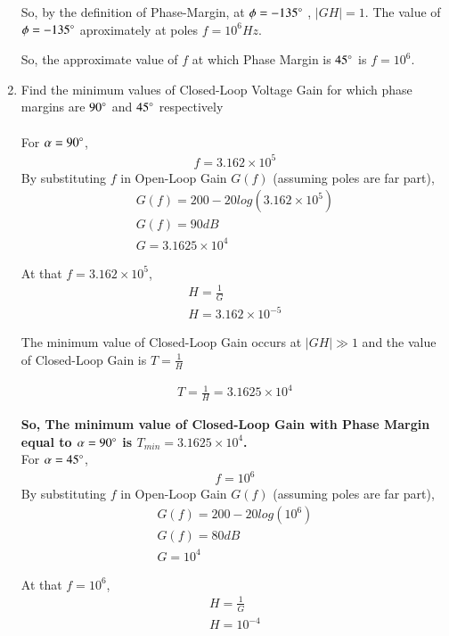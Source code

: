 \begin{enumerate}[label=\thesection.\arabic*.,ref=\thesection.\theenumi]
So, by the definition of Phase-Margin, at $\phi = -135\degree$ , $|GH| = 1 $.  The value of $\phi = -135\degree$ aproximately at poles $f=10^{6} Hz$. 

So, the approximate value of $f$ at which Phase Margin is $45\degree$ is $f=10^{6}$.\\
\item Find the minimum values of Closed-Loop Voltage Gain for which phase margins are $90\degree$ and  $45\degree$ respectively\\
\solution\\
For $\alpha=90\degree$,
\begin{align}
f=3.162 \times 10^{5}
\end{align}
By substituting $f$ in Open-Loop Gain $G(f)$ (assuming poles are far part), 
\begin{align}
G(f) = 200 - 20log(3.162 \times 10^{5})\\
G(f) = 90 dB \\
G = 3.1625 \times 10^{4}
\end{align}

At that $f=3.162 \times 10^{5}$, 
\begin{align}
H = \frac{1}{G}\\
H = 3.162 \times 10^{-5}
\end{align}

The minimum value of Closed-Loop Gain occurs at $|GH| \gg 1$ and the value of Closed-Loop Gain is $T=\frac{1}{H}$

\begin{align}
T = \frac{1}{H} = 3.1625 \times 10^{4}
\end{align}

\textbf{So, The minimum value of Closed-Loop Gain with Phase Margin equal to $\alpha=90\degree$ is $T_{min} = 3.1625 \times 10^{4}$.}\\

For $\alpha=45\degree$,
\begin{align}
f=10^{6}
\end{align}
By substituting $f$ in Open-Loop Gain $G(f)$ (assuming poles are far part), 
\begin{align}
G(f) = 200 - 20log(10^{6})\\
G(f) = 80 dB \\
G = 10^{4}
\end{align}

At that $f = 10^{6}$, 
\begin{align}
H = \frac{1}{G}\\
H = 10^{-4}
\end{align}


\end{enumerate}
